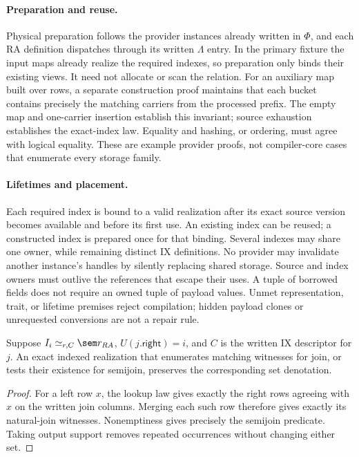 \paragraph{Preparation and reuse.}
Physical preparation follows the provider instances already written in $\Phi$,
and each RA definition dispatches through its written $\Lambda$ entry. In the primary
fixture the input maps already realize the required indexes, so preparation
only binds their existing views. It need not allocate or scan the relation.
For an auxiliary map built over rows, a separate construction proof maintains
that each bucket contains precisely the matching carriers from the processed
prefix. The empty map and one-carrier insertion establish this invariant;
source exhaustion establishes the exact-index law. Equality and hashing, or
ordering, must agree with logical equality. These are example provider proofs,
not compiler-core cases that enumerate every storage family.

\paragraph{Lifetimes and placement.}
Each required index is bound to a valid realization after its exact source
version becomes available and before its first use. An existing index can be
reused; a constructed index is prepared once for that binding. Several indexes
may share one owner, while remaining distinct IX definitions. No provider may
invalidate another instance's handles by silently replacing shared storage.
Source and index owners must outlive the references that escape their uses.
A tuple of borrowed fields does not require an owned tuple of payload values.
Unmet representation, trait, or lifetime premises reject compilation; hidden
payload clones or unrequested conversions are not a repair rule.

\begin{lemma}
Suppose $I_i\simeq_{r,C}\sem r_{RA}$, $U(j.\mathsf{right})=i$, and $C$
is the written IX descriptor for $j$. An exact indexed realization that
enumerates matching witnesses for join, or tests their existence for semijoin,
preserves the corresponding set denotation.
\end{lemma}
\begin{proof}
For a left row $x$, the lookup law gives exactly the right rows agreeing with
$x$ on the written join columns. Merging each such row therefore gives exactly
its natural-join witnesses. Nonemptiness gives precisely the semijoin predicate.
Taking output support removes repeated occurrences without changing either set.
\end{proof}

